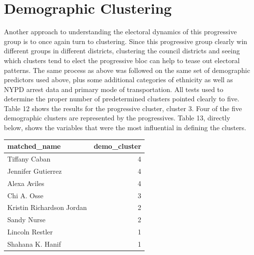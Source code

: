 \documentclass[
  letterpaper,
  DIV=11,
  numbers=noendperiod]{scrartcl}
\begin{document}
\hypertarget{demographic-clustering}{%
\section{Demographic Clustering}\label{demographic-clustering}}

Another approach to understanding the electoral dynamics of this
progressive group is to once again turn to clustering. Since this
progressive group clearly win different groups in different districts,
clustering the council districts and seeing which clusters tend to elect
the progressive bloc can help to tease out electoral patterns. The same
process as above was followed on the same set of demographic predictors
used above, plus some additional categories of ethnicity as well as NYPD
arrest data and primary mode of transportation. All tests used to
determine the proper number of predetermined clusters pointed clearly to
five. Table 12 shows the results for the progressive cluster, cluster 3.
Four of the five demographic clusters are represented by the
progressives. Table 13, directly below, shows the variables that were
the most influential in defining the clusters.

\begin{longtable}{lr}
\toprule
matched\_name & demo\_cluster \\ 
\midrule
Tiffany Caban & 4 \\ 
Jennifer Gutierrez & 4 \\ 
Alexa Aviles & 4 \\ 
Chi A. Osse & 3 \\ 
Kristin Richardson Jordan & 2 \\ 
Sandy Nurse & 2 \\ 
Lincoln Restler & 1 \\ 
Shahana K. Hanif & 1 \\ 
\bottomrule
\end{longtable}
\end{document}
